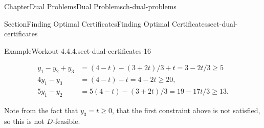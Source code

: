 \documentclass[oneside,10pt,]{book}
\numberwithin{equation}{section}
\newcommand{\amp}{&}
\begin{document}
\begin{chapterptx}{Chapter}{Dual Problems}{}{Dual Problems}{}{}{ch-dual-problems}
\begin{sectionptx}{Section}{Finding Optimal Certificates}{}{Finding Optimal Certificates}{}{}{sect-dual-certificates}
\begin{example}{Example}{Workout 4.4.4.}{sect-dual-certificates-16}
\begin{enumerate}
\par
%
\begin{equation*}
\begin{aligned}y_{1} - y_{2} + y_{3} \amp = (4-t)-(3+2t)/3+t = 3-2t/3 \geq 5 \\ 4y_{1} -y_{3} \amp = (4-t)-t = 4-2t \geq 20, \\ 5y_{1}-y_{2} \amp = 5(4-t)-(3+2t)/3 = 19-17t/3 \geq 13.\end{aligned}
\end{equation*}
%
\par
Note from the fact that \(y_{3}=t\geq0\), that the first constraint above is not satisfied, so this is not \(D\)-feasible.%
\end{enumerate}
%
\end{example}
\end{sectionptx}
\end{chapterptx}
%
%
\typeout{************************************************}
\typeout{************************************************}
%
\end{document}
